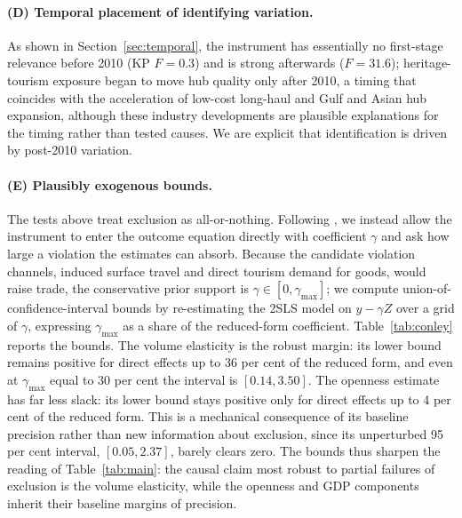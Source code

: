 \paragraph{(D) Temporal placement of identifying variation.} As shown in
Section~\ref{sec:temporal}, the instrument has essentially no first-stage
relevance before 2010 (KP $F=0.3$) and is strong afterwards ($F=31.6$);
heritage-tourism exposure began to move hub quality only after 2010, a timing
that coincides with the acceleration of low-cost long-haul and Gulf and Asian
hub expansion, although these industry developments are plausible
explanations for the timing rather than tested causes. We are explicit that
identification is driven by post-2010 variation.

\paragraph{(E) Plausibly exogenous bounds.} The tests above treat exclusion as
all-or-nothing. Following \citet{Conley_2012}, we instead allow the instrument
to enter the outcome equation directly with coefficient $\gamma$ and ask how
large a violation the estimates can absorb. Because the candidate violation
channels, induced surface travel and direct tourism demand for goods, would
raise trade, the conservative prior support is $\gamma\in[0,\gamma_{\max}]$;
we compute union-of-confidence-interval bounds by re-estimating the 2SLS model
on $y-\gamma Z$ over a grid of $\gamma$, expressing $\gamma_{\max}$ as a share
of the reduced-form coefficient. Table~\ref{tab:conley} reports the bounds.
The volume elasticity is the robust margin: its lower bound remains positive
for direct effects up to 36 per cent of the reduced form, and even at $\gamma_{\max}$ equal to 30 per cent the interval is $[0.14, 3.50]$. The openness estimate has far less slack: its lower bound stays positive only for direct effects up to 4 per cent of the reduced form. This is a mechanical consequence of its baseline precision rather than new information about exclusion, since its unperturbed 95 per cent interval, $[0.05, 2.37]$, barely clears zero. The bounds thus sharpen
the reading of Table~\ref{tab:main}: the causal claim most robust to partial
failures of exclusion is the volume elasticity, while the openness and GDP
components inherit their baseline margins of precision.

